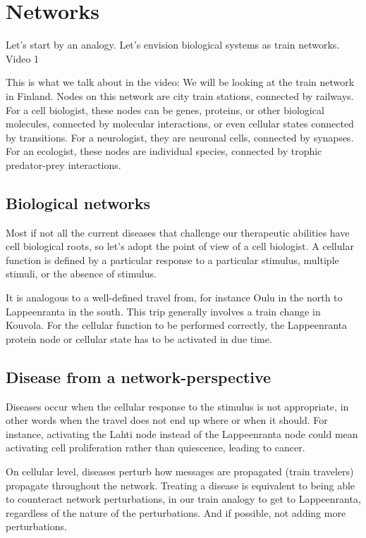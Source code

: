 \documentclass[
]{book}
\begin{document}
\hypertarget{networks}{%
\chapter{Networks}\label{networks}}

Let's start by an analogy. Let's envision biological systems as train networks.
Video 1

This is what we talk about in the video:
We will be looking at the train network in Finland. Nodes on this network are city train stations, connected by railways. For a cell biologist, these nodes can be genes, proteins, or other biological molecules, connected by molecular interactions, or even cellular states connected by transitions. For a neurologist, they are neuronal cells, connected by synapses. For an ecologist, these nodes are individual species, connected by trophic predator-prey interactions.

\hypertarget{biological-networks}{%
\section{Biological networks}\label{biological-networks}}

Most if not all the current diseases that challenge our therapeutic abilities have cell biological roots, so let's adopt the point of view of a cell biologist. A cellular function is defined by a particular response to a particular stimulus, multiple stimuli, or the absence of stimulus.

It is analogous to a well-defined travel from, for instance Oulu in the north to Lappeenranta in the south. This trip generally involves a train change in Kouvola. For the cellular function to be performed correctly, the Lappeenranta protein node or cellular state has to be activated in due time.

\hypertarget{disease-from-a-network-perspective}{%
\section{Disease from a network-perspective}\label{disease-from-a-network-perspective}}

Diseases occur when the cellular response to the stimulus is not appropriate, in other words when the travel does not end up where or when it should. For instance, activating the Lahti node instead of the Lappeenranta node could mean activating cell proliferation rather than quiescence, leading to cancer.

On cellular level, diseases perturb how messages are propagated (train travelers) propagate throughout the network. Treating a disease is equivalent to being able to counteract network perturbations, in our train analogy to get to Lappeenranta, regardless of the nature of the perturbations. And if possible, not adding more perturbations.
\end{document}
